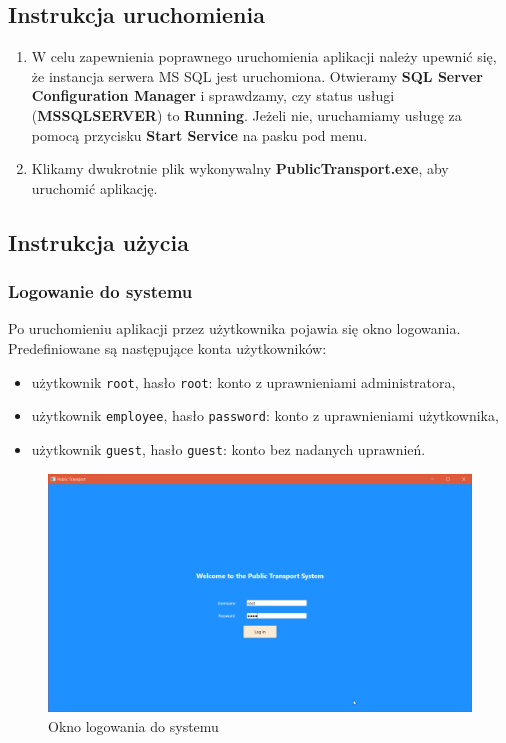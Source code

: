 \documentclass[10pt,a4paper]{article}
\begin{document}
\subsection{Instrukcja uruchomienia} %
\begin{enumerate}
	\item W celu zapewnienia poprawnego uruchomienia aplikacji należy upewnić się, że instancja serwera MS SQL jest uruchomiona. Otwieramy \textbf{SQL Server Configuration Manager} i sprawdzamy, czy status usługi (\textbf{MSSQLSERVER}) to \textbf{Running}. Jeżeli nie, uruchamiamy usługę za pomocą przycisku \textbf{Start Service} na pasku pod menu.
	\item Klikamy dwukrotnie plik wykonywalny \textbf{PublicTransport.exe}, aby uruchomić aplikację.
\end{enumerate}

\subsection{Instrukcja użycia} %

\subsubsection{Logowanie do systemu}
Po uruchomieniu aplikacji przez użytkownika pojawia się okno logowania. Predefiniowane są następujące konta użytkowników:
\begin{itemize}
	\item użytkownik \texttt{root}, hasło \texttt{root}: konto z uprawnieniami administratora,
	\item użytkownik \texttt{employee}, hasło \texttt{password}: konto z uprawnieniami użytkownika,
	\item użytkownik \texttt{guest}, hasło \texttt{guest}: konto bez nadanych uprawnień.
\end{itemize}
\begin{figure}[H]
	\centering
	\includegraphics[width=15cm]{screenshots/01_login_screen.png}
	\caption{Okno logowania do systemu}
\end{figure}
\end{document}
